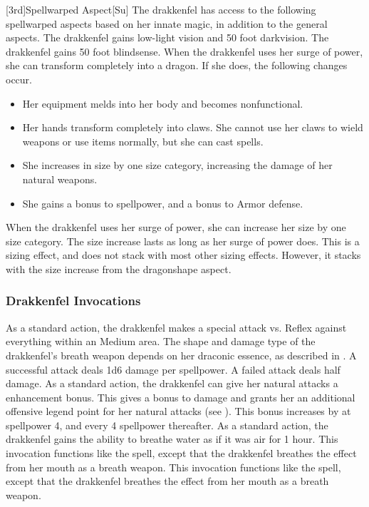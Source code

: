 [3rd]{Spellwarped Aspect}[Su]
The drakkenfel has access to the following spellwarped aspects based on her innate magic, in addition to the general aspects.
The drakkenfel gains low-light vision and 50 foot darkvision.
The drakkenfel gains 50 foot blindsense.
When the drakkenfel uses her surge of power, she can transform completely into a dragon.
If she does, the following changes occur.
\begin{itemize}
    \item Her equipment melds into her body and becomes nonfunctional.
    \item Her hands transform completely into claws. She cannot use her claws to wield weapons or use items normally, but she can cast spells.
    \item She increases in size by one size category, increasing the damage of her natural weapons.
    \item She gains a  bonus to spellpower, and a  bonus to Armor defense.
\end{itemize}
When the drakkenfel uses her surge of power, she can increase her size by one size category.
The size increase lasts as long as her surge of power does.
This is a sizing effect, and does not stack with most other sizing effects.
However, it stacks with the size increase from the dragonshape aspect.

\subsubsection{Drakkenfel Invocations}
As a standard action, the drakkenfel makes a special attack vs. Reflex against everything within an Medium area.
The shape and damage type of the drakkenfel's breath weapon depends on her draconic essence, as described in .
A successful attack deals 1d6 damage per spellpower.
A failed attack deals half damage.
As a standard action, the drakkenfel can give her natural attacks a  enhancement bonus.
This gives a  bonus to damage and grants her an additional offensive legend point for her natural attacks (see ).
This bonus increases by  at spellpower 4, and every 4 spellpower thereafter.
As a standard action, the drakkenfel gains the ability to breathe water as if it was air for 1 hour.
This invocation functions like the  spell, except that the drakkenfel breathes the effect from her mouth as a breath weapon.
This invocation functions like the  spell, except that the drakkenfel breathes the effect from her mouth as a breath weapon.

